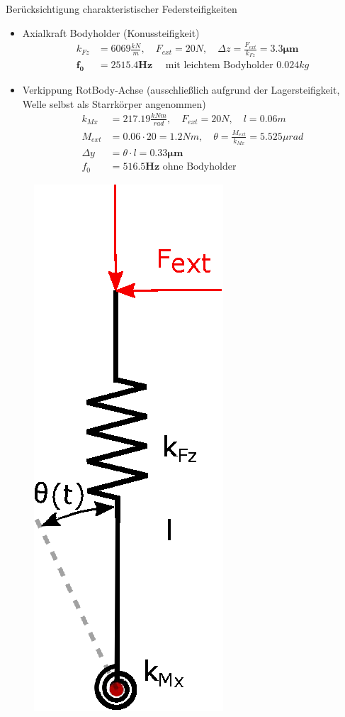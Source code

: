 \documentclass[10pt,xcolor=dvipsnames]{beamer}
\begin{document}
		
		\begin{frame}{\small Berücksichtigung charakteristischer Federsteifigkeiten}
			\begin{minipage}{0.7\textwidth}
				\begin{itemize}
					\item Axialkraft Bodyholder (Konussteifigkeit)
					\begin{align*}
					k_{Fz} &= 6069\frac{kN}{m}, \quad F_{ext}=20N,\quad \Delta z = \frac{F_{ext}}{k_{Fz}} = \bm{3.3\mu m}\\
					\bm{f_{0}} &= \bm{2515.4 Hz} \quad \text{ mit leichtem Bodyholder } 0.024kg 
					\end{align*}
					\item Verkippung RotBody-Achse (ausschließlich aufgrund der Lagersteifigkeit, Welle selbst als Starrkörper angenommen)
					\begin{align*}
					k_{Mx} &= 217.19\frac{kNm}{rad}, \quad F_{ext}=20N, \quad l=0.06m\\
					M_{ext} &= 0.06\cdot20 = 1.2Nm,\quad \theta = \frac{M_{ext}}{k_{Mx}} = 5.525\mu rad\\
					\Delta y &= \theta\cdot l=\bm{0.33\mu m}\\ 
					f_{0} &= \bm{516.5 Hz} \text{ ohne Bodyholder}
					\end{align*}
					
				\end{itemize}
			\end{minipage}
			\hfill
			\begin{minipage}{0.28\textwidth}
				\begin{figure}
					\includegraphics[width=0.4\linewidth]{./pics/rotBody.eps}\\\vspace{0.5cm}
				\end{figure}
			\end{minipage}
		\end{frame}
	
\end{document}
